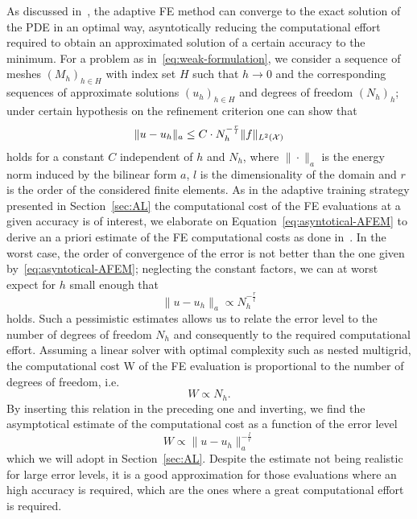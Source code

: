 As discussed in~\cite[Chapter 6.3]{DeuflhardWeiser2012}, the adaptive FE method can converge to the exact solution of the PDE in an optimal way, asyntotically reducing the computational effort required to obtain an approximated solution of a certain accuracy to the minimum. 
For a problem as in~\eqref{eq:weak-formulation}, we consider a sequence of meshes $(M_h)_{h\in H}$ with index set $H$ such that $h \rightarrow 0$ and the corresponding sequences of approximate solutions $(u_h)_{h\in H}$ and degrees of freedom $(N_h)_h$; under certain hypothesis on the refinement criterion one can show that 
\begin{equation}\label{eq:asyntotical-AFEM}
    \| u - u_h \|_a \leq C \cdot N_h^{-\frac{r}{l}} \|f\|_{L^2(\mathcal X)} 
\end{equation}
holds for a constant $C$ independent of $h$ and $N_h$, where $\| \cdot \|_a$ is the energy norm induced by the bilinear form $a$, $l$ is the dimensionality of the domain and $r$ is the order of the considered finite elements. \newline
As in the adaptive training strategy presented in Section~\ref{sec:AL} the computational cost of the FE evaluations at a given accuracy is of interest, we elaborate on Equation~\eqref{eq:asyntotical-AFEM} to derive an a priori estimate of the FE computational costs as done in~\cite{SemlerWeiser2023}.
In the worst case, the order of convergence of the error is not better than the one given by~\eqref{eq:asyntotical-AFEM}; neglecting the constant factors, we can at worst expect for $h$ small enough that
\[
    \| u - u_h \|_a \propto N_h^{-\frac{r}{l}}
\]
holds.
Such a pessimistic estimates allows us to relate the error level to the number of degrees of freedom $N_h$ and consequently to the required computational effort.
Assuming a linear solver with optimal complexity such as nested multigrid, the computational cost W of the FE evaluation is proportional to the number of degrees of freedom, i.e. 
\[
    W \propto N_h.
\]
By inserting this relation in the preceding one and inverting, we find the asymptotical estimate of the computational cost as a function of the error level
\begin{equation}\label{eq:FE-cost}
    W \propto \| u - u_h \|_a^{-\frac{l}{r}}
\end{equation}
which we will adopt in Section~\ref{sec:AL}.
Despite the estimate not being realistic for large error levels, it is a good approximation for those evaluations where an high accuracy is required, which are the ones where a great computational effort is required.
